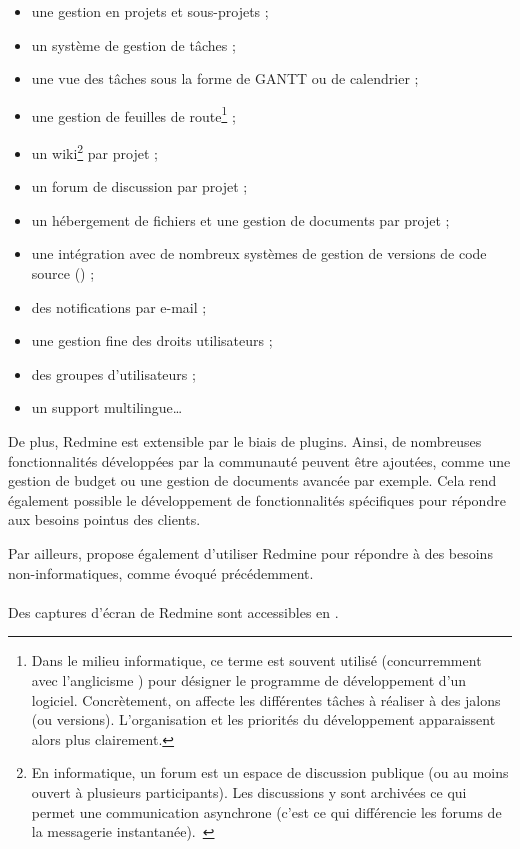 \begin{itemize}
	\item une gestion en projets et sous-projets ;
	\item un système de gestion de tâches ;
	\item une vue des tâches sous la forme de GANTT ou de calendrier ;
	\item une gestion de feuilles de route\footnote{Dans le milieu informatique, ce terme est souvent utilisé (concurremment avec l'anglicisme ) pour désigner le programme de développement d'un logiciel. Concrètement, on affecte les différentes tâches à réaliser à des jalons (ou versions). L'organisation et les priorités du développement apparaissent alors plus clairement.} ;
	\item un wiki\footnote{En informatique, un forum est un espace de discussion publique (ou au moins ouvert à plusieurs participants). Les discussions y sont archivées ce qui permet une communication asynchrone (c'est ce qui différencie les forums de la messagerie instantanée).~\cite{forum}} par projet ;
	\item un forum de discussion par projet ;
	\item un hébergement de fichiers et une gestion de documents par projet ;
	\item une intégration avec de nombreux systèmes de gestion de versions de code source () ;
	\item des notifications par e-mail ;
	\item une gestion fine des droits utilisateurs ;
	\item des groupes d'utilisateurs ;
	\item un support multilingue\ldots
\end{itemize}

De plus, Redmine est extensible par le biais de plugins.
Ainsi, de nombreuses fonctionnalités développées par la communauté peuvent être ajoutées, comme une gestion de budget ou une gestion de documents avancée par exemple.
Cela rend également possible le développement de fonctionnalités spécifiques pour répondre aux besoins pointus des clients.

Par ailleurs, \asmile{} propose également d'utiliser Redmine pour répondre à des besoins non-informatiques, comme évoqué précédemment.

\paragraph{}
Des captures d'écran de Redmine sont accessibles en .



